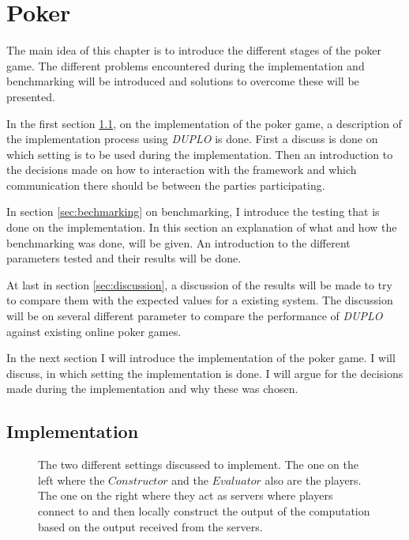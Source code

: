 \documentclass[twoside,11pt,openright]{report}
\newcommand{\DUPLO}{\textit{DUPLO} }
\begin{document}
\chapter{Poker}
\label{ch:implementation}
The main idea of this chapter is to introduce the different stages of the poker game. The different problems encountered during the implementation and benchmarking will be introduced and solutions to overcome these will be presented.

In the first section \ref{sec:poker_imp}, on the implementation of the poker game, a description of the implementation process using \DUPLO is done. First a discuss is done on which setting is to be used during the implementation. Then an introduction to the decisions made on how to interaction with the framework and which communication there should be between the parties participating.

In section \ref{sec:bechmarking} on benchmarking, I introduce the testing that is done on the implementation. In this section an explanation of what and how the benchmarking was done, will be given. An introduction to the different parameters tested and their results will be done.

At last in section \ref{sec:discussion}, a discussion of the results will be made to try to compare them with the expected values for a existing system. The discussion will be on several different parameter to compare the performance of \DUPLO against existing online poker games.

\bigskip

In the next section I will introduce the implementation of the poker game. I will discuss, in which setting the implementation is done. I will argue for the decisions made during the implementation and why these was chosen. 

\section{Implementation}
\label{sec:poker_imp}

\begin{figure}[t]
\centering

\caption{The two different settings discussed to implement. The one on the left where the $Constructor$ and the $Evaluator$ also are the players. The one on the right where they act as servers where players connect to and then locally construct the output of the computation based on the output received from the servers.}
\label{fig:poker_setting}
\end{figure}
\end{document}
